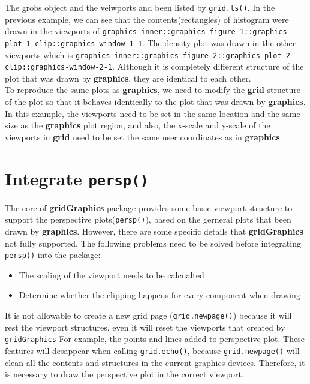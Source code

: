 \documentclass[paper=a4, fontsize=11pt]{report}
\begin{document}
The grobs object and the veiwports and been listed by \texttt{grid.ls()}. In the previous example, we can see that the contents(rectangles) of histogram were drawn in the viewports of \texttt{graphics-inner::graphics-figure-1::graphics-plot-1-clip::graphics-window-1-1}. The density plot was drawn in the other viewports which is \texttt{graphics-inner::graphics-figure-2::graphics-plot-2-clip::graphics-window-2-1}. Although it is completely different structure of the plot that was drawn by \textbf{graphics}, they are identical to each other.\\

To reproduce the same plots as \textbf{graphics}, we need to modify the \textbf{grid} structure of the plot so that it behaves identically to the plot that was drawn by \textbf{graphics}. In this example, the viewports need to be set in the same location and the same size as the \textbf{graphics} plot region, and also, the x-scale and y-scale of the viewports in \textbf{grid} need to be set the same user coordinates as in \textbf{graphics}.\\

\section{Integrate \texttt{persp()}}
The core of \textbf{gridGraphics} package provides some basic viewport structure to support the perspective plots(\texttt{persp()}), based on the gerneral plots that been drawn by \textbf{graphics}. However, there are some specific details that \textbf{gridGraphics} not fully supported.
The following problems need to be solved before integrating \texttt{persp()} into the package:
\begin{itemize}
	\item{The scaling of the viewport needs to be calcualted}
	\item{Determine whether the clipping happens for every component when drawing}
\end{itemize}

It is not allowable to create a new grid page (\texttt{grid.newpage()}) because it will rest the viewport structures, even it will reset the viewports that created by \texttt{gridGraphics}
For example, the points and lines added to perspective plot. These features will desappear when calling \texttt{grid.echo()}, because \texttt{grid.newpage()} will clean all the contents and structures in the current graphics devices. Therefore, it is necessary to draw the perspective plot in the correct viewport.\\
\end{document}
